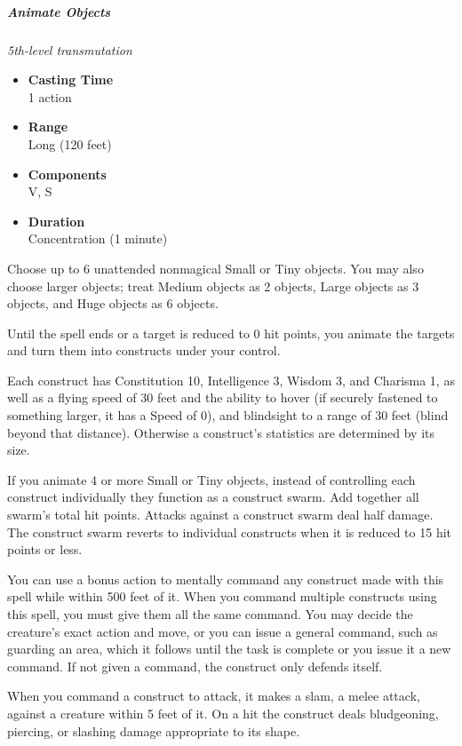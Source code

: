 \subparagraph{Animate
Objects}\label{Spell_Animate_Objects_animate-objects}

\emph{5th-level transmutation}

\begin{itemize}
\item
  \textbf{Casting Time}\\
  1 action
\item
  \textbf{Range}\\
  Long (120 feet)
\item
  \textbf{Components}\\
  V, S
\item
  \textbf{Duration}\\
  Concentration (1 minute)
\end{itemize}

Choose up to 6 unattended nonmagical Small or Tiny objects. You may also
choose larger objects; treat Medium objects as 2 objects, Large objects
as 3 objects, and Huge objects as 6 objects.

Until the spell ends or a target is reduced to 0 hit points, you animate
the targets and turn them into constructs under your control.

Each construct has Constitution 10, Intelligence 3, Wisdom 3, and
Charisma 1, as well as a flying speed of 30 feet and the ability to
hover (if securely fastened to something larger, it has a Speed of 0),
and blindsight to a range of 30 feet (blind beyond that distance).
Otherwise a construct's statistics are determined by its size.

If you animate 4 or more Small or Tiny objects, instead of controlling
each construct individually they function as a construct swarm. Add
together all swarm's total hit points. Attacks against a construct swarm
deal half damage. The construct swarm reverts to individual constructs
when it is reduced to 15 hit points or less.

You can use a bonus action to mentally command any construct made with
this spell while within 500 feet of it. When you command multiple
constructs using this spell, you must give them all the same command.
You may decide the creature's exact action and move, or you can issue a
general command, such as guarding an area, which it follows until the
task is complete or you issue it a new command. If not given a command,
the construct only defends itself.

When you command a construct to attack, it makes a slam, a melee attack,
against a creature within 5 feet of it. On a hit the construct deals
bludgeoning, piercing, or slashing damage appropriate to its shape.

